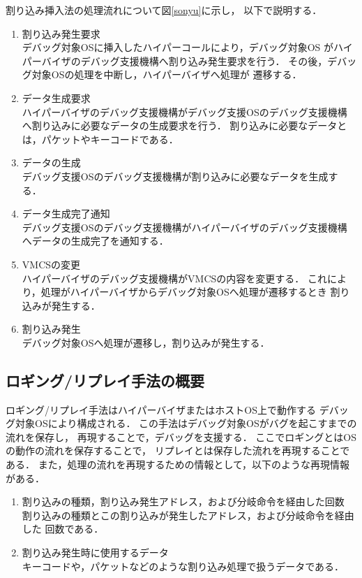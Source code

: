 \documentclass[tanilab-enum]{graduate}
\begin{document}
    割り込み挿入法の処理流れについて図\ref{sonyu}に示し，
    以下で説明する．
    \begin{enumerate}
        \item 割り込み発生要求\\
            デバッグ対象OSに挿入したハイパーコールにより，デバッグ対象OS
            がハイパーバイザのデバッグ支援機構へ割り込み発生要求を行う．
            その後，デバッグ対象OSの処理を中断し，ハイパーバイザへ処理が
            遷移する．
        \item データ生成要求\\
            ハイパーバイザのデバッグ支援機構がデバッグ支援OSのデバッグ支援機構
            へ割り込みに必要なデータの生成要求を行う．
            割り込みに必要なデータとは，パケットやキーコードである．
        \item データの生成\\
            デバッグ支援OSのデバッグ支援機構が割り込みに必要なデータを生成する．
        \item データ生成完了通知\\
            デバッグ支援OSのデバッグ支援機構がハイパーバイザのデバッグ支援機構
            へデータの生成完了を通知する．
        \item VMCSの変更\\
            ハイパーバイザのデバッグ支援機構がVMCSの内容を変更する．
            これにより，処理がハイパーバイザからデバッグ対象OSへ処理が遷移するとき
            割り込みが発生する．
        \item 割り込み発生\\
            デバッグ対象OSへ処理が遷移し，割り込みが発生する．
    \end{enumerate}
    \subsection{ロギング/リプレイ手法の概要}
    ロギング/リプレイ手法はハイパーバイザまたはホストOS上で動作する
    デバッグ対象OSにより構成される．
    この手法はデバッグ対象OSがバグを起こすまでの流れを保存し，
    再現することで，デバッグを支援する．
    ここでロギングとはOSの動作の流れを保存することで，
    リプレイとは保存した流れを再現することである．
    また，処理の流れを再現するための情報として，以下のような再現情報
    がある．
    \begin{enumerate}
        \item 割り込みの種類，割り込み発生アドレス，および分岐命令を経由した回数\\
            割り込みの種類とこの割り込みが発生したアドレス，および分岐命令を経由した
            回数である．
        \item 割り込み発生時に使用するデータ\\
            キーコードや，パケットなどのような割り込み処理で扱うデータである．
    \end{enumerate}
\end{document}
